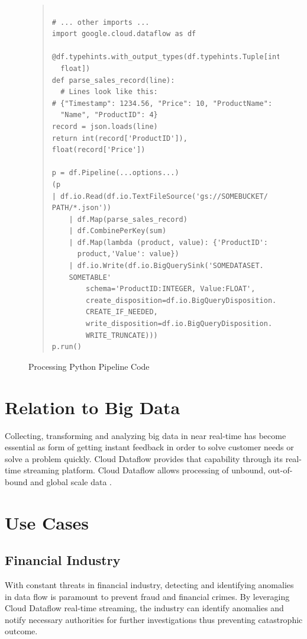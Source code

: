 \documentclass[9pt,twocolumn,twoside]{styles/osajnl}
\begin{document}
\begin{figure}[htb]
\begin{quote}
\begin{Verbatim}
    
# ... other imports ...
import google.cloud.dataflow as df

@df.typehints.with_output_types(df.typehints.Tuple[int,
  float])
def parse_sales_record(line):
  # Lines look like this:
# {"Timestamp": 1234.56, "Price": 10, "ProductName":
  "Name", "ProductID": 4}
record = json.loads(line)
return int(record['ProductID']), float(record['Price'])

p = df.Pipeline(...options...)
(p
| df.io.Read(df.io.TextFileSource('gs://SOMEBUCKET/
PATH/*.json'))
    | df.Map(parse_sales_record)
    | df.CombinePerKey(sum)
    | df.Map(lambda (product, value): {'ProductID':
      product,'Value': value})
    | df.io.Write(df.io.BigQuerySink('SOMEDATASET.
    SOMETABLE'
        schema='ProductID:INTEGER, Value:FLOAT',
        create_disposition=df.io.BigQueryDisposition.
        CREATE_IF_NEEDED,
        write_disposition=df.io.BigQueryDisposition.
        WRITE_TRUNCATE)))
p.run() \end{Verbatim}
\end{quote}
\caption{Processing Python Pipeline Code \cite{www-pythoncode}}\label{alg:python}
\end{figure}

\section{Relation to Big Data}

Collecting, transforming and analyzing big data in near real-time has
become essential as form of getting instant feedback in order to solve
customer needs or solve a problem quickly. Cloud Dataflow provides
that capability through its real-time streaming platform. Cloud
Dataflow allows processing of unbound, out-of-bound and global scale
data \cite{www-statefulprocess}.

\section{Use Cases}

\subsection{Financial Industry}

With constant threats in financial industry, detecting and identifying
anomalies in data flow is paramount to prevent fraud and financial
crimes. By leveraging Cloud Dataflow real-time streaming, the industry
can identify anomalies and notify necessary authorities for further
investigations thus preventing catastrophic outcome.
\end{document}
